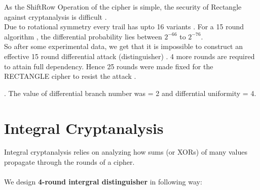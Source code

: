 \documentclass[journal=tosc,preprint]{iacrtrans}
\begin{document}
As the ShiftRow Operation of the cipher is simple, the security of Rectangle against cryptanalysis is difficult . \\
Due to rotational symmetry every trail has upto 16 variants . For a 15 round algorithm , the differential probability lies between $2^{-66}$ to $2^{-76}$.\\

So after some experimental data, we get that it is impossible to construct an effective 15 round differential attack (distinguisher) . 4 more rounds are required to attain full dependency. Hence 25 rounds were made fixed for the RECTANGLE cipher to resist the attack . 



.
The value of differential branch number was = 2 and differntial uniformity = 4.
\section{Integral Cryptanalysis}
Integral cryptanalysis relies on analyzing how sums (or XORs) of many values propagate through the rounds of a cipher.\\\\
We design \textbf{4-round intergral distinguisher} in following way:
\end{document}
